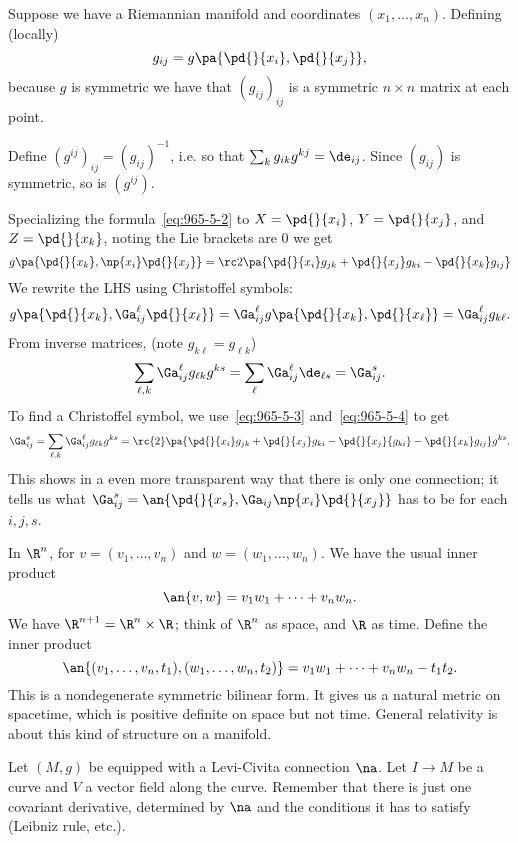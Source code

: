 Suppose we have a Riemannian manifold and coordinates $(x_1,\ldots, x_n)$. Defining (locally)
\[
g_{ij}=g\pa{
\pd{}{x_i},\pd{}{x_j}
},
\]
because $g$ is symmetric 
we have that $(g_{ij})_{ij}$ is a symmetric $n\times n$ matrix at each point.

Define $(g^{ij})_{ij}=(g_{ij})^{-1}$, i.e. so that $\sum_kg_{ik}g^{kj}=\de_{ij}$. Since $(g_{ij})$ is symmetric, so is $(g^{ij})$.

Specializing the formula~\eqref{eq:965-5-2} to $X=\pd{}{x_i}$, $Y=\pd{}{x_j}$, and $Z=\pd{}{x_k}$, noting the Lie brackets are 0 we get
\begin{equation}\label{eq:965-5-3}
g\pa{
\pd{}{x_k},\np{x_i}\pd{}{x_j}
}=\rc2\pa{
\pd{}{x_i}g_{jk}+\pd{}{x_j}g_{ki}-\pd{}{x_k}g_{ij}
}
\end{equation}
We rewrite the LHS using Christoffel symbols:
\[g\pa{\pd{}{x_k},\Ga_{ij}^{\ell}\pd{}{x_{\ell}}}=\Ga_{ij}^{\ell} g\pa{\pd{}{x_k},\pd{}{x_{\ell}}}=\Ga_{ij}^{\ell}g_{k\ell}.\]
From inverse matrices, (note $g_{k\ell}=g_{\ell k}$)
\begin{equation}\label{eq:965-5-4}
\sum_{\ell,k} \Ga_{ij}^{\ell}g_{\ell k} g^{ks} = \sum_{\ell} \Ga_{ij}^{\ell} \de_{\ell s}=\Ga_{ij}^s.
\end{equation}
To find a Christoffel symbol, we use~\eqref{eq:965-5-3} and~\eqref{eq:965-5-4} to get
\[
\Ga_{ij}^s=\sum_{\ell,k}\Ga_{ij}^{\ell}g_{\ell k}g^{ks}=\rc{2}\pa{
\pd{}{x_i}g_{jk}+\pd{}{x_j}g_{ki}-\pd{}{x_j}{g_{ki}}-\pd{}{x_k}g_{ij}}g^{ks}.
\]
This shows in a even more transparent way that there is only one connection; it tells us what $\Ga_{ij}^s=\an{\pd{}{x_s},\Ga_{ij}\np{x_i}\pd{}{x_j}}$ has to be for each $i,j,s$.


\begin{ex}
In $\R^n$, for $v=(v_1,\ldots, v_n)$ and $w=(w_1,\ldots, w_n)$. We have the usual inner product
\[
\an{v,w}=v_1w_1+\cdots+v_nw_n.
\]
We have $\R^{n+1}=\R^n\times \R$; think of $\R^{n}$ as space, and $\R$ as time.
Define the inner product
\[
\an{(v_1,\ldots, v_n,t_1),(w_1,\ldots, w_n,t_2)}=v_1w_1+\cdots +v_nw_n-t_1t_2.
\]
This is a nondegenerate symmetric bilinear form. %
It gives us a natural metric on spacetime, which is positive definite on space but not time. General relativity is about this kind of structure on a manifold.
\end{ex}
Let $(M,g)$ be equipped with a Levi-Civita connection $\na$. Let $I\to M$ be a curve and $V$ a vector field along the curve. Remember that there is just one covariant derivative, determined by $\na$ and the conditions it has to satisfy (Leibniz rule, etc.). 

